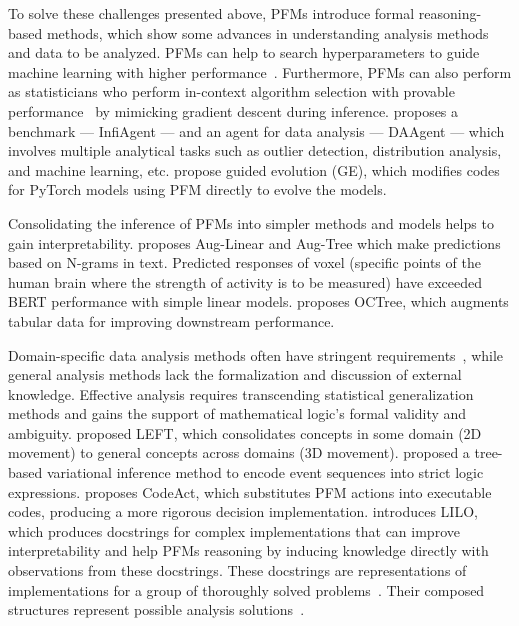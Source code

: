   
  To solve these challenges presented above, PFMs introduce formal reasoning-based methods, which show some advances in understanding analysis methods and data to be analyzed. PFMs can help to search hyperparameters to guide machine learning with higher performance~\cite{sayed2024gizaml}. Furthermore, PFMs can also perform as statisticians who perform in-context algorithm selection with provable performance~\cite{bai2024transformers} by mimicking gradient descent during inference. \cite{HuZWCM0WSXZCY0K24} proposes a benchmark — InfiAgent — and an agent for data analysis — DAAgent — which involves multiple analytical tasks such as outlier detection, distribution analysis, and machine learning, etc. \cite{EoTGE} propose guided evolution (GE), which modifies codes for PyTorch models using PFM directly to evolve the models. 
  
  Consolidating the inference of PFMs into simpler methods and models helps to gain interpretability. \cite{singh2023augmenting} proposes Aug-Linear and Aug-Tree which make predictions based on N-grams in text. Predicted responses of voxel (specific points of the human brain where the strength of activity is to be measured) have exceeded BERT performance with simple linear models. \cite{nam2024optimized} proposes OCTree, which augments tabular data for improving downstream performance. 
  
  Domain-specific data analysis methods often have stringent requirements~\cite{020arlot2010survey}, while general analysis methods lack the formalization and discussion of external knowledge. Effective analysis requires transcending statistical generalization methods and gains the support of mathematical logic's formal validity and ambiguity. \cite{HsuMTW23} proposed LEFT, which consolidates concepts in some domain (2D movement) to general concepts across domains (3D movement). \cite{SongY00024} proposed a tree-based variational inference method to encode event sequences into strict logic expressions. \cite{WangCY0L0J24} proposes CodeAct, which substitutes PFM actions into executable codes, producing a more rigorous decision implementation. \cite{GrandWBOLTA24} introduces LILO, which produces docstrings for complex implementations that can improve interpretability and help PFMs reasoning by inducing knowledge directly with observations from these docstrings. These docstrings are representations of implementations for a group of thoroughly solved problems~\cite{yuan2023power}. Their composed structures represent possible analysis solutions~\cite{zhengprise}.
  
